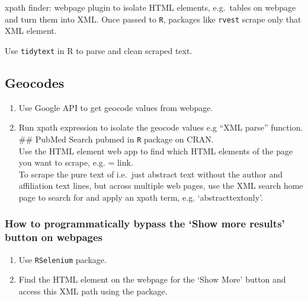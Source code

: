 \documentclass[10,portrait]{article}
\providecommand{\tightlist}{%
  \setlength{\itemsep}{0pt}\setlength{\parskip}{0pt}}
\begin{document}
xpath finder: webpage plugin to isolate HTML elements, e.g.~tables on
webpage and turn them into XML. Once passed to \texttt{R}, packages like
\texttt{rvest} scrape only that XML element.

Use \texttt{tidytext} in R to parse and clean scraped text.

\subsection{Geocodes}\label{geocodes}

\begin{enumerate}
\def\labelenumi{\arabic{enumi}.}
\tightlist
\item
  Use Google API to get geocode values from webpage.\\
\item
  Run xpath expression to isolate the geocode values e.g ``XML parse''
  function.\\
  \#\# PubMed Search pubmed in \texttt{R} package on CRAN.\\
  Use the HTML element web app to find which HTML elements of the page
  you want to scrape, e.g. = link.\\
  To scrape the pure text of i.e.~just abstract text without the author
  and affiliation text lines, but across multiple web pages, use the XML
  search home page to search for and apply an xpath term, e.g.
  `abstracttextonly'.
\end{enumerate}

\subsubsection{\texorpdfstring{How to programmatically bypass the `Show
more results' button on
webpages}{How to programmatically bypass the Show more results button on webpages}}\label{how-to-programmatically-bypass-the-show-more-results-button-on-webpages}

\begin{enumerate}
\def\labelenumi{\arabic{enumi}.}
\tightlist
\item
  Use \texttt{RSelenium} package.\\
\item
  Find the HTML element on the webpage for the `Show More' button and
  access this XML path using the package.
\end{enumerate}

\printbibliography
\end{document}
